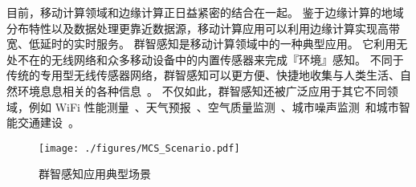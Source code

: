 
目前，移动计算领域和边缘计算正日益紧密的结合在一起。
鉴于边缘计算的地域分布特性以及数据处理更靠近数据源，移动计算应用可以利用边缘计算实现高带宽、低延时的实时服务。
群智感知是移动计算领域中的一种典型应用。
它利用无处不在的无线网络和众多移动设备中的内置传感器来完成『环境』感知。
不同于传统的专用型无线传感器网络，群智感知可以更方便、快捷地收集与人类生活、自然环境息息相关的各种信息~\cite{DBLP:journals/cm/GuoCZYC16}。
不仅如此，群智感知还被广泛应用于其它不同领域，例如 WiFi 性能测量~\cite{DBLP:journals/cm/RosenLLCMB14}、天气预报~\cite{DBLP:journals/tpds/ZhaoMTL15}、空气质量监测~\cite{DBLP:conf/huc/ZhangXWC14}、城市噪声监测~\cite{DBLP:conf/huc/ZhengLWZLC14}和城市智能交通建设~\cite{DBLP:conf/icdcs/ZhouJL15}。



\begin{figure}[!b]
  \centering
  \vspace{-1em}
  \texttt{[image: ./figures/MCS\_Scenario.pdf]}
  \vspace{-0.5em}
  \caption{群智感知应用典型场景}
  \label{Figure_UIC_MCS}
\end{figure}

